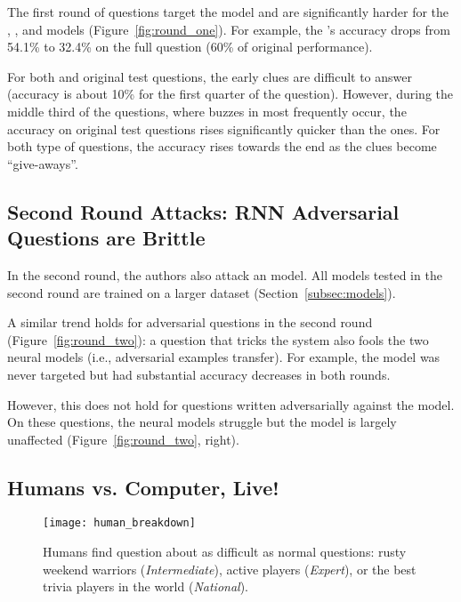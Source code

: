 The first round of \challenge{} questions target the  model
and are significantly harder for the ,
, and  models (Figure~\ref{fig:round_one}). For example,
the 's accuracy drops from 54.1\% to 32.4\% on the full question
 (60\% of original performance).

For both \challenge{} and original test questions, the early
clues are difficult to answer (accuracy is about
10\% for the first quarter of the question). However, during the middle third 
of the questions, where buzzes in \qb{} most
frequently occur, the accuracy on original test questions rises
significantly quicker than the \challenge{} ones. For both type of questions,
the accuracy rises towards the end as the clues become
``give-aways''.

 \subsection{Second Round Attacks: RNN Adversarial Questions are Brittle}\label{subsec:two}

In the second round, the authors also attack an  model.
All models tested in the second round are trained on a larger dataset (Section~\ref{subsec:models}).

A similar trend holds for  adversarial questions
in the second round (Figure~\ref{fig:round_two}): a question that tricks the  system also fools
the two neural models (i.e., adversarial examples transfer). For example, the  model
was never targeted but had substantial
accuracy decreases in both rounds.

However, this does not hold for questions written adversarially
against the  model. On these questions, the neural models
struggle but the 
 model is largely
unaffected (Figure~\ref{fig:round_two}, right).

\subsection{Humans vs. Computer, Live!}
\label{subsec:live}

\begin{figure*}
\centering
\texttt{[image: human\_breakdown]}
\caption{Humans find \challenge{} question about as difficult as
  normal questions: rusty weekend
  warriors (\textit{Intermediate}), active players (\textit{Expert}), or
  the best trivia players in the world (\textit{National}).}
\label{fig:human_breakdown}
\end{figure*}

